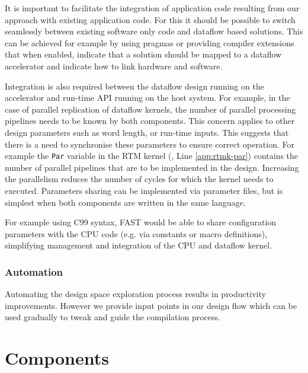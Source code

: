 It is important to facilitate the integration of application code
resulting from our approach with existing application code. For this
it should be possible to switch seamlessly between existing software
only code and dataflow based solutions. This can be achieved for
example by using pragmas or providing compiler extensions that when
enabled, indicate that a solution should be mapped to a dataflow
accelerator and indicate how to link hardware and software.

Integration is also required between the dataflow design running on
the accelerator and run-time API running on the host system. For
example, in the case of parallel replication of dataflow kernels, the
number of parallel processing pipelines needs to be known by both
components. This concern applies to other design parameters such as
word length, or run-time inputs. This suggests that there is a need to
synchronise these parameters to ensure correct operation. For example
the \texttt{Par} variable in the RTM kernel (,
Line \ref{app:rtmk-par}) contains the number of parallel pipelines
that are to be implemented in the design. Increasing the parallelism
reduces the number of cycles for which the kernel needs to executed.
Parameters sharing can be implemented via parameter files, but is
simplest when both components are written in the same language.

For example using C99 syntax, FAST would be able to share configuration
parameters with the CPU code (e.g. via constants or macro
definitions), simplifying management and integration of the CPU and
dataflow kernel.

\subsubsection{Automation}

Automating the design space exploration process results in
productivity improvements. However we provide input points in our
design flow which can be used gradually to tweak and guide the
compilation process.

\section{Components}

